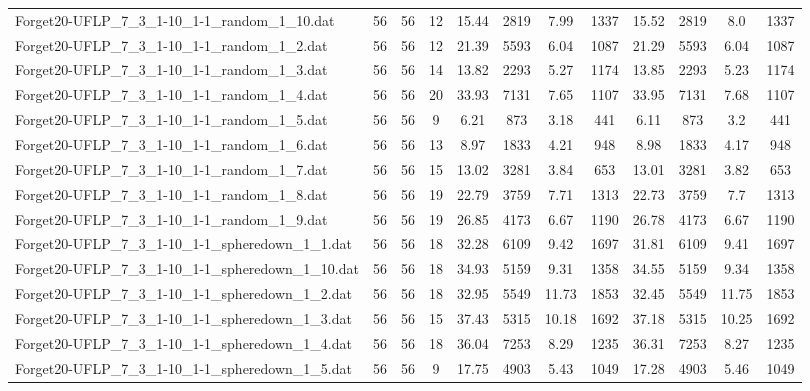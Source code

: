 \begin{sidewaystable}[!ht]
{\begin{tabular}{lccccccccccc}
Forget20-UFLP\_7\_3\_1-10\_1-1\_random\_1\_10.dat & 56 & 56 & 12 & 15.44 & 2819 &  \textcolor{blue2}{7.99} & 1337 & 15.52 & 2819 & 8.0 & 1337 \\
Forget20-UFLP\_7\_3\_1-10\_1-1\_random\_1\_2.dat & 56 & 56 & 12 & 21.39 & 5593 & 6.04 & 1087 & 21.29 & 5593 & 6.04 & 1087 \\
Forget20-UFLP\_7\_3\_1-10\_1-1\_random\_1\_3.dat & 56 & 56 & 14 & 13.82 & 2293 & 5.27 & 1174 & 13.85 & 2293 &  \textcolor{blue2}{5.23} & 1174 \\
Forget20-UFLP\_7\_3\_1-10\_1-1\_random\_1\_4.dat & 56 & 56 & 20 & 33.93 & 7131 & 7.65 & 1107 & 33.95 & 7131 & 7.68 & 1107 \\
Forget20-UFLP\_7\_3\_1-10\_1-1\_random\_1\_5.dat & 56 & 56 & 9 & 6.21 & 873 & 3.18 & 441 & 6.11 & 873 & 3.2 & 441 \\
Forget20-UFLP\_7\_3\_1-10\_1-1\_random\_1\_6.dat & 56 & 56 & 13 & 8.97 & 1833 & 4.21 & 948 & 8.98 & 1833 &  \textcolor{blue2}{4.17} & 948 \\
Forget20-UFLP\_7\_3\_1-10\_1-1\_random\_1\_7.dat & 56 & 56 & 15 & 13.02 & 3281 & 3.84 & 653 & 13.01 & 3281 &  \textcolor{blue2}{3.82} & 653 \\
Forget20-UFLP\_7\_3\_1-10\_1-1\_random\_1\_8.dat & 56 & 56 & 19 & 22.79 & 3759 & 7.71 & 1313 & 22.73 & 3759 &  \textcolor{blue2}{7.7} & 1313 \\
Forget20-UFLP\_7\_3\_1-10\_1-1\_random\_1\_9.dat & 56 & 56 & 19 & 26.85 & 4173 &  \textcolor{blue2}{6.67} & 1190 & 26.78 & 4173 &  \textcolor{blue2}{6.67} & 1190 \\
Forget20-UFLP\_7\_3\_1-10\_1-1\_spheredown\_1\_1.dat & 56 & 56 & 18 & 32.28 & 6109 & 9.42 & 1697 & 31.81 & 6109 &  \textcolor{blue2}{9.41} & 1697 \\
Forget20-UFLP\_7\_3\_1-10\_1-1\_spheredown\_1\_10.dat & 56 & 56 & 18 & 34.93 & 5159 &  \textcolor{blue2}{9.31} & 1358 & 34.55 & 5159 & 9.34 & 1358 \\
Forget20-UFLP\_7\_3\_1-10\_1-1\_spheredown\_1\_2.dat & 56 & 56 & 18 & 32.95 & 5549 &  \textcolor{blue2}{11.73} & 1853 & 32.45 & 5549 & 11.75 & 1853 \\
Forget20-UFLP\_7\_3\_1-10\_1-1\_spheredown\_1\_3.dat & 56 & 56 & 15 & 37.43 & 5315 &  \textcolor{blue2}{10.18} & 1692 & 37.18 & 5315 & 10.25 & 1692 \\
Forget20-UFLP\_7\_3\_1-10\_1-1\_spheredown\_1\_4.dat & 56 & 56 & 18 & 36.04 & 7253 & 8.29 & 1235 & 36.31 & 7253 &  \textcolor{blue2}{8.27} & 1235 \\
Forget20-UFLP\_7\_3\_1-10\_1-1\_spheredown\_1\_5.dat & 56 & 56 & 9 & 17.75 & 4903 &  \textcolor{blue2}{5.43} & 1049 & 17.28 & 4903 & 5.46 & 1049 \\

\end{tabular}}
\end{sidewaystable}
